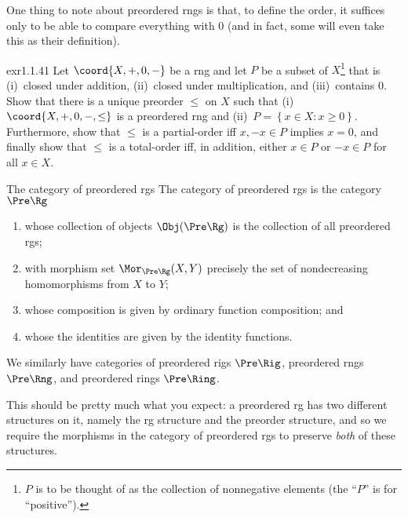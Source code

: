 One thing to note about preordered rngs is that, to define the order, it suffices only to be able to compare everything with $0$ (and in fact, some will even take this as their definition).
\begin{exr}{}{exr1.1.41}
Let $\coord{X,+,0,-}$ be a rng and let $P$ be a subset of $X$\footnote{$P$ is to be thought of as the collection of nonnegative elements (the ``$P$'' is for ``positive'').} that is (i)~closed under addition, (ii)~closed under multiplication, and (iii)~contains $0$.  Show that there is a unique preorder $\leq$ on $X$ such that (i)~$\coord{X,+,0,-,\leq}$ is a preordered rng and (ii)~$P=\left\{ x\in X:x\geq 0\right\}$.  Furthermore, show that $\leq$ is a partial-order iff $x,-x\in P$ implies $x=0$, and finally show that $\leq$ is a total-order iff, in addition, either $x\in P$ or $-x\in P$ for all $x\in X$.
\end{exr}
\begin{dfn}{The category of preordered rgs}{}
The category of preordered rgs is the category $\Pre \Rg$\index[notation]{$\Pre \Rg$}
\begin{enumerate}
\item whose collection of objects $\Obj (\Pre \Rg )$ is the collection of all preordered rgs;
\item with morphism set $\Mor _{\Pre \Rg}(X,Y)$ precisely the set of nondecreasing homomorphisms from $X$ to $Y$;
\item whose composition is given by ordinary function composition; and
\item whose the identities are given by the identity functions.
\end{enumerate}
\begin{rmk}
We similarly have categories of preordered rigs $\Pre \Rig$\index[notation]{$\Pre \Rig$}, preordered rngs $\Pre \Rng$\index[notation]{$\Pre \Rng$}, and preordered rings $\Pre \Ring$\index[notation]{$\Pre \Ring$}.
\end{rmk}
\begin{rmk}
This should be pretty much what you expect:  a preordered rg has two different structures on it, namely the rg structure and the preorder structure, and so we require the morphisms in the category of preordered rgs to preserve \emph{both} of these structures.
\end{rmk}
\end{dfn}

